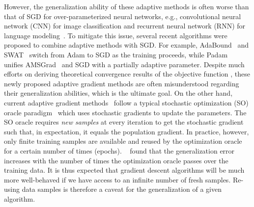 \documentclass[11pt]{article}
\begin{document}
However, the generalization ability of these adaptive methods is often worse than that of SGD for over-parameterized neural networks, e.g., convolutional neural network (CNN) for image classification and recurrent neural network (RNN) for language modeling~\citep{wiro17}. 
To mitigate this issue, several recent algorithms were proposed to combine adaptive methods with SGD.
For example, AdaBound~\citep{luxi2019} and SWAT~\citep{keso2017} switch from Adam to SGD as the training proceeds, while Padam~\citep{chgu2018, zhta18} unifies AMSGrad~\citep{reka2018} and SGD with a partially adaptive parameter.  
Despite much efforts on deriving theoretical convergence results of the objective function \citep{zare18,wawu19, zosh2019, cheli2019}, these newly proposed adaptive gradient methods are often misunderstood regarding their generalization abilities, which is the ultimate goal.
On the other hand, current adaptive gradient methods~\citep{duha11,kiba15,tige12, reka2018, wawu19} follow a typical stochastic optimization (SO) oracle paradigm~\citep{romo51, ghla2013} which uses stochastic gradients to update the parameters. 
The SO oracle requires \emph{new samples} at every iteration to get the stochastic gradient such that, in expectation, it equals the population gradient. 
In practice, however, only finite training samples are available and reused by the optimization oracle for a certain number of times (\ie epochs). 
~\citet{hare2016} found that the generalization error increases with the number of times the optimization oracle passes over the training data. 
It is thus expected that gradient descent algorithms will be much more well-behaved if we have access to an infinite number of fresh samples. 
Re-using data samples is therefore a caveat for the generalization of a given algorithm.
\end{document}
